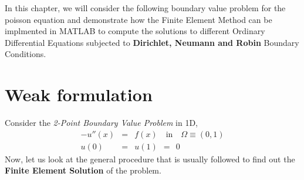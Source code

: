 \hspace{5mm}In this chapter, we will consider the following boundary value problem for the poisson equation and demonstrate how the Finite Element Method can be implmented in MATLAB to compute the solutions to different Ordinary Differential Equations subjected to \textbf{Dirichlet, Neumann and Robin} Boundary Conditions.
\section{Weak formulation}
\hspace{5.4mm}Consider the \emph{2-Point Boundary Value Problem} in 1D,
\begin{eqnarray}
-u''(x) &=& f(x) \quad \text{in} \quad \Omega \equiv (0,1)\label{model}\\
u(0) &=& u(1) \ \ = \ \ 0
\end{eqnarray}
Now, let us look at the general procedure that is usually followed to find out the \textbf{Finite Element Solution} of the problem.

